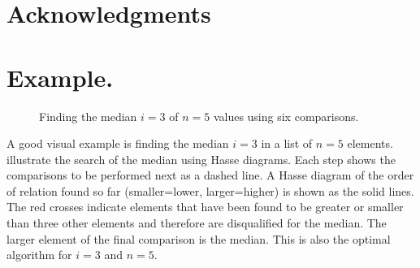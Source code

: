 \documentclass[twoside,leqno,twocolumn]{article}
\begin{document}
\section*{Acknowledgments}




\clearpage
\appendix


\section{Example.}
\begin{figure}[!b]
  \centering
  
  \caption{Finding the median $i = 3$ of $n = 5$ values using six comparisons.}
  \label{fig:median_of_5}
\end{figure}
A good visual example is finding the median $i = 3$ in a list of $n = 5$ elements.
 illustrate the search of the median using Hasse diagrams.
Each step shows the comparisons to be performed next as a dashed line.
A Hasse diagram of the order of relation found so far (smaller=lower, larger=higher) is shown as the solid lines.
The red crosses indicate elements that have been found to be greater or smaller than three other elements and therefore are disqualified for the median.
The larger element of the final comparison is the median.
This is also the optimal algorithm for $i = 3$ and $n = 5$.
\end{document}
